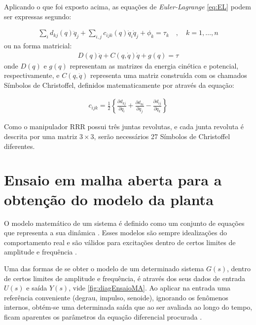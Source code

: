 Aplicando o que foi exposto acima, as equações de \textit{Euler-Lagrange} 
\eqref{eq:EL} podem ser expressas segundo:

\begin{equation}
  \begin{gathered}
    \sum_i d_{kj}(q)\ddot q_j + \sum_{i,j}c_{ijk}(q)\dot q_i\dot q_j + \phi_k = \tau_k \quad, \quad k=1,\dots,n
  \end{gathered}
  \label{eq:EL_Final}
\end{equation}
ou na forma matricial:
\begin{equation}
  \begin{gathered}
    D(q)\ddot q + C(q,\dot q)\dot q + g(q) = \tau
  \end{gathered}
  \label{eq:EL_FinalMat}
\end{equation}
onde $D(q)$ e $g(q)$ representam as matrizes da energia cinética e potencial, 
respectivamente, e $C(q,\dot q)$ representa uma matriz construída com os chamados
Símbolos de Christoffel, definidos matematicamente por  através
da equação:

\begin{equation}
  \begin{gathered}
    c_{ijk} = \frac{1}{2} \left\{ \frac{\partial d_{kj}}{\partial q_i}+\frac{\partial d_{ki}}{\partial q_j}-\frac{\partial d_{ij}}{\partial q_k} \right\}
  \end{gathered}
  \label{eq:christoffel}
\end{equation}

Como o manipulador RRR possui três juntas revolutas, e cada junta revoluta é descrita por uma matriz 
$3 \times 3$, serão necessários 27 Símbolos de Christoffel diferentes.

\section{Ensaio em malha aberta para a obtenção do modelo da planta}

O modelo matemático de um sistema é definido como um conjunto de equações que representa a sua dinâmica \cite{Ogata}. 
Esses modelos são sempre idealizações do comportamento
real e são válidos para excitações dentro de certos limites de amplitude e frequência \cite{Castrucci}.

Uma das formas de se obter o modelo de um determinado sistema $G(s)$, dentro de certos limites de amplitude e frequência,
é através dos seus dados de entrada $U(s)$ e saída $Y(s)$, vide \autoref{fig:diagEnsaioMA}. Ao aplicar na entrada uma 
referência conveniente (degrau, impulso, senoide), ignorando os fenômenos internos, obtém-se uma determinada saída que ao 
ser avaliada ao longo do tempo, ficam aparentes os parâmetros da equação diferencial procurada \cite{Castrucci}.

